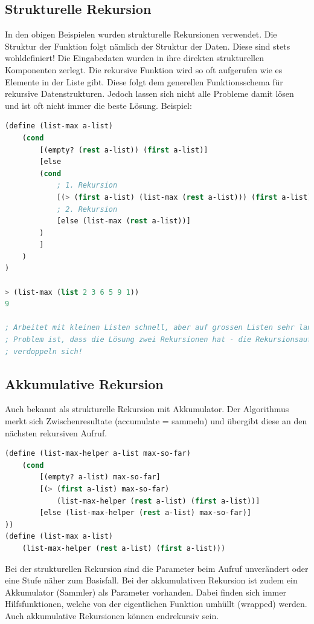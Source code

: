 \subsection{Strukturelle Rekursion}
In den obigen Beispielen wurden strukturelle Rekursionen verwendet. Die Struktur der Funktion folgt nämlich der Struktur der Daten. Diese sind stets wohldefiniert! Die Eingabedaten wurden in ihre direkten strukturellen Komponenten zerlegt. Die rekursive Funktion wird so oft aufgerufen wie es Elemente in der Liste gibt. Diese folgt dem generellen Funktionsschema für rekursive Datenstrukturen. Jedoch lassen sich nicht alle Probleme damit lösen und ist oft nicht immer die beste Lösung. Beispiel:

\begin{lstlisting}[language=Lisp, caption=Strukturelle Rekursion - Beispiel Maximumssuche]
(define (list-max a-list)
	(cond
		[(empty? (rest a-list)) (first a-list)]
		[else 
		(cond
			; 1. Rekursion
			[(> (first a-list) (list-max (rest a-list))) (first a-list)]
			; 2. Rekursion
			[else (list-max (rest a-list))]
		)
		]
	)
)

> (list-max (list 2 3 6 5 9 1))
9

; Arbeitet mit kleinen Listen schnell, aber auf grossen Listen sehr langsam. Das 
; Problem ist, dass die Lösung zwei Rekursionen hat - die Rekursionsaufrufe
; verdoppeln sich!
\end{lstlisting}

\newpage

\subsection{Akkumulative Rekursion}
Auch bekannt als strukturelle Rekursion mit Akkumulator. Der Algorithmus merkt sich Zwischenresultate (accumulate = sammeln) und übergibt diese an den nächsten rekursiven Aufruf.

\begin{lstlisting}[language=Lisp, caption=Akkumulative Rekursion - Beispiel Maximumssuche]
(define (list-max-helper a-list max-so-far)
	(cond
		[(empty? a-list) max-so-far]
		[(> (first a-list) max-so-far)
			(list-max-helper (rest a-list) (first a-list))]
		[else (list-max-helper (rest a-list) max-so-far)]
))
(define (list-max a-list)
	(list-max-helper (rest a-list) (first a-list)))
\end{lstlisting}

Bei der strukturellen Rekursion sind die Parameter beim Aufruf unverändert oder eine Stufe näher zum Basisfall. Bei der akkumulativen Rekursion ist zudem ein Akkumulator (Sammler) als Parameter vorhanden. Dabei finden sich immer Hilfsfunktionen, welche von der eigentlichen Funktion umhüllt (wrapped) werden. Auch akkumulative Rekursionen können endrekursiv sein.

